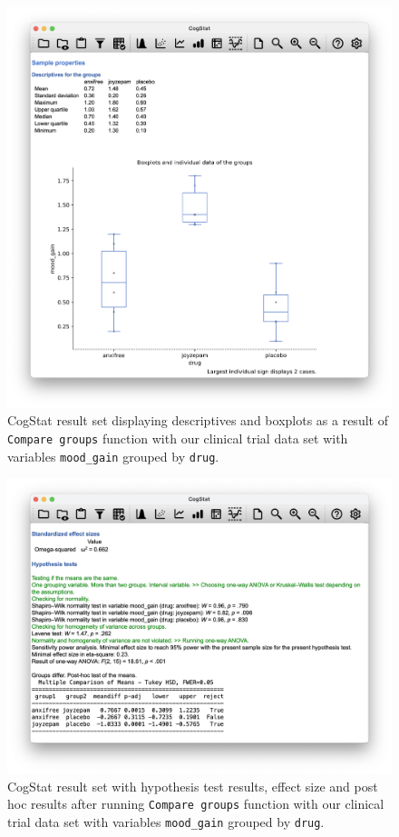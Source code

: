 \documentclass[
  11pt,
  a4paper,
  twoside,symmetric,openright]{book}
\theoremstyle{break}
\theoremstyle{break}
\begin{document}
\begin{figure}

{\centering \includegraphics[width=0.6\linewidth]{resources/image/moodbydrug} 

}

\caption{CogStat result set displaying descriptives and boxplots as a result of \texttt{Compare\ groups} function with our clinical trial data set with variables \texttt{mood\_gain} grouped by \texttt{drug}.}\label{fig:cogcompbydrugdescr}
\end{figure}



\begin{figure}

{\centering \includegraphics[width=0.6\linewidth]{resources/image/moodbydrughypo} 

}

\caption{CogStat result set with hypothesis test results, effect size and post hoc results after running \texttt{Compare\ groups} function with our clinical trial data set with variables \texttt{mood\_gain} grouped by \texttt{drug}.}\label{fig:cogcompbydrug}
\end{figure}
\end{document}
